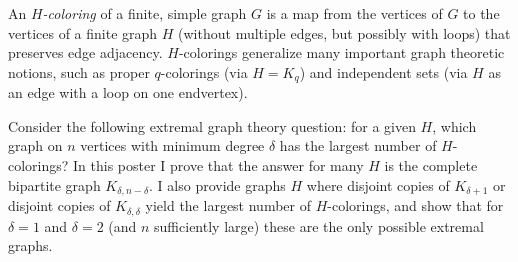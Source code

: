 \endtitle

An \textit{$H$-coloring} of a finite, simple graph $G$ is a map from the vertices of $G$ to the vertices of a finite graph $H$ (without multiple edges, but possibly with loops) that preserves edge adjacency.  $H$-colorings generalize many important graph theoretic notions, such as proper $q$-colorings (via $H = K_{q}$) and independent sets (via $H$ as an edge with a loop on one endvertex).

Consider the following extremal graph theory question: for a given $H$, which graph on $n$ vertices with minimum degree $\delta$ has the largest number of $H$-colorings?  In this poster I prove that the answer for many $H$ is the complete bipartite graph $K_{\delta, n-\delta}$.  I also provide graphs $H$ where disjoint copies of $K_{\delta+1}$ or disjoint copies of $K_{\delta, \delta}$ yield the largest number of $H$-colorings, and show that for $\delta=1$ and $\delta=2$ (and $n$ sufficiently large) these are the only possible extremal graphs.